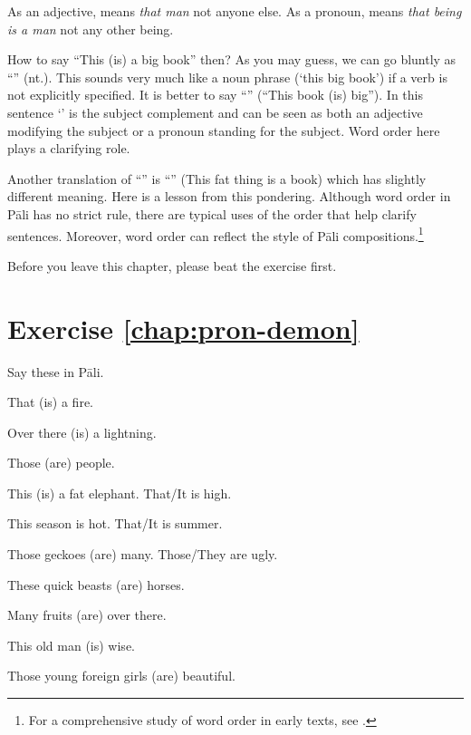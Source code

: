 As an adjective,  means \emph{that man} not anyone else. As a pronoun,  means \emph{that being is a man} not any other being.

How to say ``This (is) a big book'' then? As you may guess, we can go bluntly as ``'' (nt.). This sounds very much like a noun phrase (`this big book') if a verb is not explicitly specified. It is better to say ``'' (``This book (is) big''). In this sentence `' is the subject complement and  can be seen as both an adjective modifying the subject or a pronoun standing for the subject. Word order here plays a clarifying role.

Another translation of ``'' is ``'' (This fat thing is a book) which has slightly different meaning. Here is a lesson from this pondering. Although word order in P\=ali has no strict rule, there are typical uses of the order that help clarify sentences. Moreover, word order can reflect the style of P\=ali compositions.\footnote{For a comprehensive study of word order in early texts, see \citealp{bodhiprasiddhinand:order}.}

Before you leave this chapter, please beat the exercise first.

\section*{Exercise \ref{chap:pron-demon}}
Say these in P\=ali.
\begin{compactenum}
\item That (is) a fire.
\item Over there (is) a lightning.
\item Those (are) people.
\item This (is) a fat elephant. That/It is high.
\item This season is hot. That/It is summer.
\item Those geckoes (are) many. Those/They are ugly.
\item These quick beasts (are) horses.
\item Many fruits (are) over there.
\item This old man (is) wise.
\item Those young foreign girls (are) beautiful.
\end{compactenum}
